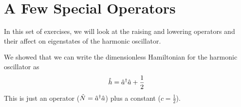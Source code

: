 \section*{A Few Special Operators}

	In this set of exercises, we will look at the raising and lowering operators and their affect on eigenstates of the harmonic oscillator.

	\begin{questions}
	
		\question We showed that we can write the dimensionless Hamiltonian for the harmonic oscillator as 
			\begin{equation*}
				\hat h = \hat a^\dag \hat a + \frac{1}{2}
			\end{equation*}
			This is just an operator ($\hat N = \hat a^\dag \hat a$) plus a constant ($c = \frac{1}{2}$).
			


\end{questions}
